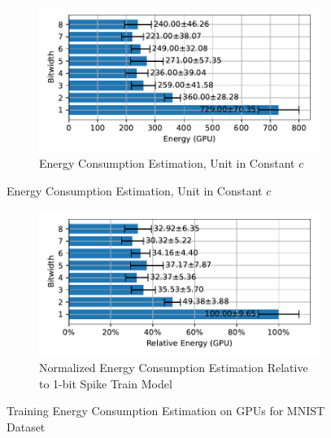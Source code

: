         \begin{figure}[H]
            \centering
            \begin{subfigure}[H]{0.6\textwidth}
                \includegraphics[width=\textwidth]{../standard/MNIST/plots/mnist_train_energy_gpu_horizontal.pdf}
                \caption{Energy Consumption Estimation, Unit in Constant $c$}
            \end{subfigure}
        \end{figure}
        \begin{figure}[H]
            \centering
            \ContinuedFloat
            \begin{subfigure}[H]{0.6\textwidth}
                \includegraphics[width=\textwidth]{../standard/MNIST/plots/mnist_train_relative_energy_gpu_horizontal.pdf}
                \caption{Normalized Energy Consumption Estimation Relative to 1-bit Spike Train Model}
            \end{subfigure}
            \caption{Training Energy Consumption Estimation on GPUs for MNIST Dataset}
        \end{figure}

    \label{appendix:energy_gpu_nmnist}

